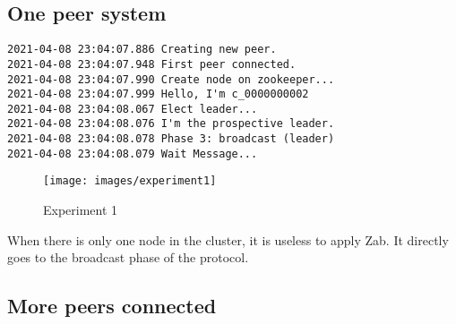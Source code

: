 \subsection{One peer system\label{sec:one}}

\begin{verbatim}
2021-04-08 23:04:07.886 Creating new peer.
2021-04-08 23:04:07.948 First peer connected.
2021-04-08 23:04:07.990 Create node on zookeeper...
2021-04-08 23:04:07.999 Hello, I'm c_0000000002
2021-04-08 23:04:08.067 Elect leader...
2021-04-08 23:04:08.076 I'm the prospective leader.
2021-04-08 23:04:08.078 Phase 3: broadcast (leader)
2021-04-08 23:04:08.079 Wait Message...
\end{verbatim}

\begin{figure}[H]
    \centering
    \texttt{[image: images/experiment1]}
    \caption{Experiment 1}
    \label{fig:experiment1}
\end{figure}

When there is only one node in the cluster, it is useless to apply Zab. It directly goes to the broadcast phase of the protocol.


\subsection{More peers connected\label{sec:more}}

